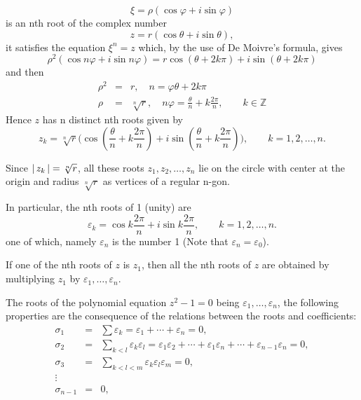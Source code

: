 \documentclass[11pt]{amsbook}
\begin{document}

\[
    \xi = \rho(\cos\varphi + i\sin\varphi)
\]
is an nth root of the complex number
\[
    z=r(\cos\theta + i\sin\theta),
\]
it satisfies the equation $\xi^n=z$ which, by the use of De Moivre's formula, gives
\[
    \rho^2(\cos n\varphi + i\sin n\varphi) = r \cos(\theta+2k\pi)+i\sin(\theta+2k\pi)
\]
and then
\begin{eqnarray*}
    \rho^2&=&r, \quad n=\varphi\theta+2k\pi\\
    \rho&=&\sqrt[n]{r},\quad n\varphi=\frac{\theta}{n}+k\frac{2\pi}{n},\quad\quad k\in\mathbb{Z}
\end{eqnarray*}
Hence $z$ has n distinct nth roots given by
\[
    z_k=\sqrt[n]{r}\Big(\cos(\frac{\theta}{n}+k\frac{2\pi}{n})+i\sin(\frac{\theta}{n}+k\frac{2\pi}{n})\Big),\quad\quad k=1,2,\dotsc,n.
\]

\par Since $\left \lvert \, z_k \, \right \rvert=\sqrt[n]{r}$, all these roots $z_1, z_2,\dotsc, z_n$ lie on the circle with center at the origin and radius $\sqrt[n]{r}$ as vertices of a regular n-gon.
\par In particular, the nth roots of 1 (unity) are
\[
    \varepsilon_k = \cos k\frac{2\pi}{n} + i \sin k\frac{2\pi}{n}, \quad\quad k=1,2,\dotsc,n.
\]
one of which, namely $\varepsilon_n$ is the number 1 (Note that $\varepsilon_n=\varepsilon_0$). 

\par If one of the nth roots of $z$ is $z_1$, then all the nth roots of $z$ are obtained by multiplying $z_1$ by $\varepsilon_1,\dotsc,\varepsilon_n$.
\par The roots of the polynomial equation $z^2-1=0$ being $\varepsilon_1,\dotsc,\varepsilon_n$, the following properties are the consequence of the relations between the roots and coefficients:
\begin{eqnarray*}
    \sigma_1 &=& \sum \varepsilon_k=\varepsilon_1+\dotsb+\varepsilon_n=0,\\
    \sigma_2 &=& \sum_{k<l} \varepsilon_k \varepsilon_l=\varepsilon_1 \varepsilon_2+\dotsb+\varepsilon_1 \varepsilon_n+\dotsb+ \varepsilon_{n-1} \varepsilon_n=0,\\
    \sigma_3 &=& \sum_{k<l<m} \varepsilon_k \varepsilon_l \varepsilon_m=0,\\
    \vdots\\
    \sigma_{n-1}&=&0,\\
\end{eqnarray*}

\end{document}

